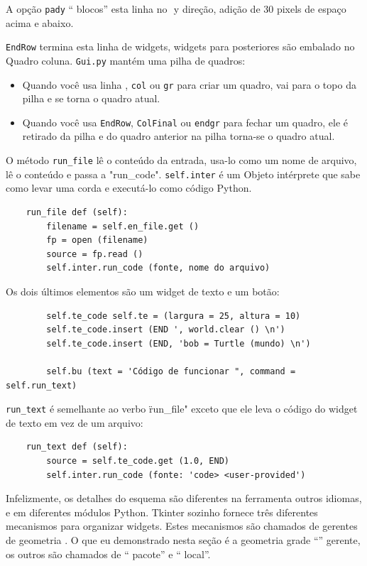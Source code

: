 \documentclass[10pt]{book}
\begin{document}
\begin{v erbatim}
A opção {\tt pady} `` blocos'' esta linha no $ $ y direção,
adição de 30 pixels de espaço acima e abaixo.

{\tt EndRow} termina esta linha de widgets, widgets para posteriores são
embalado no Quadro coluna. {\tt Gui.py} mantém uma pilha de quadros:

\begin{itemize}

\item Quando você usa {linha \tt}, {\tt col} ou {\tt gr} para criar um quadro,
vai para o topo da pilha e se torna o quadro atual.

\item Quando você usa {\tt EndRow}, {\tt ColFinal} ou {\tt endgr} para fechar
um quadro, ele é retirado da pilha e do quadro anterior na
pilha torna-se o quadro atual.

\end{itemize} 

O método \verb "run_file" lê o conteúdo da entrada,
usa-lo como um nome de arquivo, lê o conteúdo
e passa a \verbo "run_code". {\tt self.inter} é um
Objeto intérprete que sabe como levar uma corda e
executá-lo como código Python.

\begin{verbatim}
    run_file def (self):
        filename = self.en_file.get ()
        fp = open (filename)
        source = fp.read ()
        self.inter.run_code (fonte, nome do arquivo)
\end{verbatim}
%
Os dois últimos elementos são um widget de texto e um botão:

\begin{verbatim}
        self.te_code self.te = (largura = 25, altura = 10)
        self.te_code.insert (END ', world.clear () \n')
        self.te_code.insert (END, 'bob = Turtle (mundo) \n')

        self.bu (text = 'Código de funcionar ", command = self.run_text)
\end{verbatim}
%
\Verb "run_text" é semelhante ao verbo \"run_file" exceto que ele leva
o código do widget de texto em vez de um arquivo:

\begin{verbatim}
    run_text def (self):
        source = self.te_code.get (1.0, END)
        self.inter.run_code (fonte: 'code> <user-provided')
\end{verbatim}
%
Infelizmente, os detalhes do esquema são diferentes na ferramenta
outros idiomas, e em diferentes módulos Python.
Tkinter sozinho fornece três diferentes mecanismos para organizar
widgets. Estes mecanismos são chamados de gerentes de geometria {\bf}.
O que eu demonstrado nesta seção é a geometria grade ``''
gerente, os outros são chamados de `` pacote'' e `` local''.


\end{v erbatim}
\end{document}
